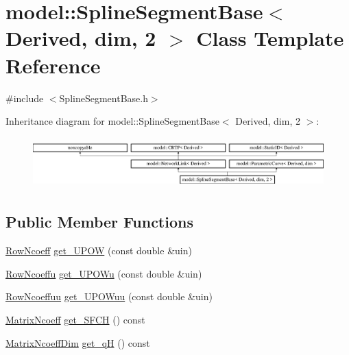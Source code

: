 \hypertarget{classmodel_1_1_spline_segment_base_3_01_derived_00_01dim_00_012_01_4}{}\section{model\+:\+:Spline\+Segment\+Base$<$ Derived, dim, 2 $>$ Class Template Reference}
\label{classmodel_1_1_spline_segment_base_3_01_derived_00_01dim_00_012_01_4}


{\ttfamily \#include $<$Spline\+Segment\+Base.\+h$>$}

Inheritance diagram for model\+:\+:Spline\+Segment\+Base$<$ Derived, dim, 2 $>$\+:\begin{figure}[H]
\begin{center}
\leavevmode
\includegraphics[height=1.978799cm]{classmodel_1_1_spline_segment_base_3_01_derived_00_01dim_00_012_01_4}
\end{center}
\end{figure}
\subsection*{Public Member Functions}
\begin{DoxyCompactItemize}
\item 
\hyperlink{_spline_enums_8h_a5a92526eb02d4d15fb803231f2cefe6d}{Row\+Ncoeff} \hyperlink{classmodel_1_1_spline_segment_base_3_01_derived_00_01dim_00_012_01_4_af5cf19d81f0da35a2b07ea821b0a3238}{get\+\_\+\+U\+P\+O\+W} (const double \&uin)
\item 
\hyperlink{_spline_enums_8h_a1d55d9eae696394fe669c29c2b10b48d}{Row\+Ncoeffu} \hyperlink{classmodel_1_1_spline_segment_base_3_01_derived_00_01dim_00_012_01_4_aeb3f1ffa58b844a7d1e53f5edee15ab2}{get\+\_\+\+U\+P\+O\+Wu} (const double \&uin)
\item 
\hyperlink{_spline_enums_8h_a442d520d229fc9d7ccfcc1f21d289230}{Row\+Ncoeffuu} \hyperlink{classmodel_1_1_spline_segment_base_3_01_derived_00_01dim_00_012_01_4_a359243f9b9ae95accbff73685373bd17}{get\+\_\+\+U\+P\+O\+Wuu} (const double \&uin)
\item 
\hyperlink{_spline_enums_8h_ab371c7f03c86d5953dc3b76e33bc4032}{Matrix\+Ncoeff} \hyperlink{classmodel_1_1_spline_segment_base_3_01_derived_00_01dim_00_012_01_4_af89ea9dc60d047d557c9540edc245a14}{get\+\_\+\+S\+F\+C\+H} () const 
\item 
\hyperlink{_spline_enums_8h_afafac8412b0453751e060d8170f20bec}{Matrix\+Ncoeff\+Dim} \hyperlink{classmodel_1_1_spline_segment_base_3_01_derived_00_01dim_00_012_01_4_a4ef2adb2dd72a0de2842a9cca28b34fc}{get\+\_\+q\+H} () const 
\end{DoxyCompactItemize}
